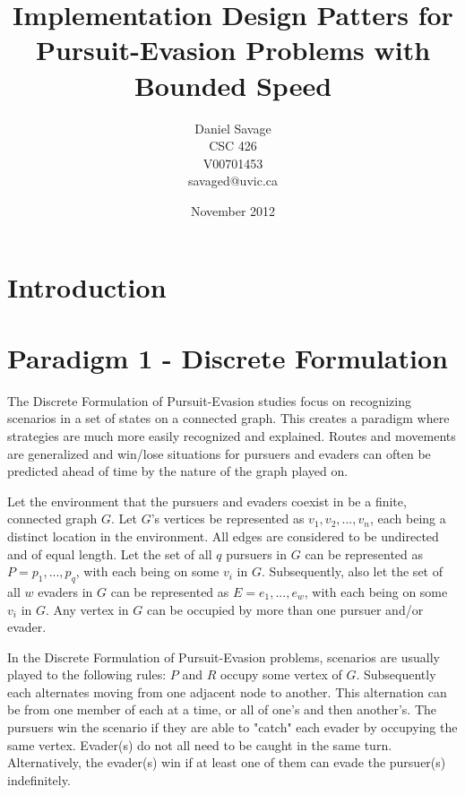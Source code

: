 \documentclass{article}
\begin{document}
\title{Implementation Design Patters for Pursuit-Evasion Problems with Bounded Speed}
\author{Daniel Savage\\CSC 426\\{V00701453}\\savaged@uvic.ca}
\date{November 2012}
\maketitle
\pagebreak

\section{Introduction}

\section{Paradigm 1 - Discrete Formulation}
The Discrete Formulation of Pursuit-Evasion studies focus on recognizing scenarios in a set of states on a connected graph. This creates a paradigm where strategies are much more easily recognized and explained. Routes and movements are generalized and win/lose situations for pursuers and evaders can often be predicted ahead of time by the nature of the graph played on.

Let the environment that the pursuers and evaders coexist in be a finite, connected graph \(G\). Let \(G\)'s vertices be represented as \(v_1,v_2,...,v_n\), each being a distinct location in the environment. All edges are considered to be undirected and of equal length. Let the set of all \(q\) pursuers in \(G\) can be represented as \(P = {p_1,...,p_q}\), with each being on some \(v_i\) in \(G\). Subsequently, also let the set of all \(w\) evaders in \(G\) can be represented as \(E = {e_1,...,e_w}\), with each being on some \(v_i\) in \(G\). Any vertex in \(G\) can be occupied by more than one pursuer and/or evader.

In the Discrete Formulation of Pursuit-Evasion problems, scenarios are usually played to the following rules: \(P\) and \(R\) occupy some vertex of \(G\). Subsequently each alternates moving from one adjacent node to another. This alternation can be from one member of each at a time, or all of one's and then another's. The pursuers win the scenario if they are able to "catch" each evader by occupying the same vertex. Evader(s) do not all need to be caught in the same turn. Alternatively, the evader(s) win if at least one of them can evade the pursuer(s) indefinitely.\cite{copsRobbers}
\end{document}
